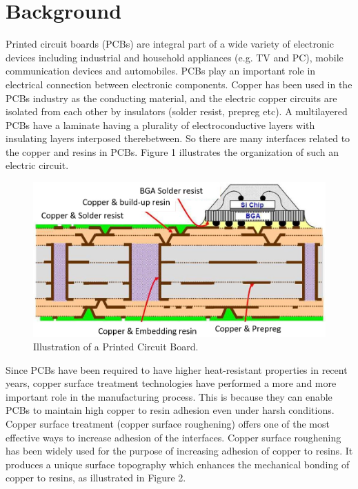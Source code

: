\documentclass[10pt,twocolumn,letterpaper]{article}
\begin{document}
\section{Background}

Printed circuit boards (PCBs) are integral part of a wide variety of electronic devices including industrial and household appliances (e.g. TV and PC), mobile communication devices and automobiles. PCBs play an important role in electrical connection between electronic components. Copper has been used in the PCBs industry as the conducting material, and the electric copper circuits are isolated from each other by insulators (solder resist, prepreg etc). A multilayered PCBs have a laminate having a plurality of electroconductive layers with insulating layers interposed therebetween. So there are many interfaces related to the copper and resins in PCBs. Figure 1 illustrates the organization of such an electric circuit.


\begin{figure}[h]
	\centering
	\includegraphics[width=0.9\linewidth]{"./figures/Figure1"}
	\caption{
		Illustration of a Printed Circuit Board. 
	}
\end{figure}


Since PCBs have been required to have higher heat-resistant properties in recent years, copper surface treatment technologies have performed a more and more important role in the manufacturing process. This is because they can enable PCBs  to maintain high copper to resin adhesion even under harsh conditions. Copper surface treatment (copper surface roughening) offers one of the most effective ways to increase adhesion of the interfaces. Copper surface roughening has been widely used for the purpose of increasing adhesion of copper to resins. It produces a unique surface topography which enhances the mechanical bonding of copper to resins, as illustrated in Figure 2.
\end{document}
